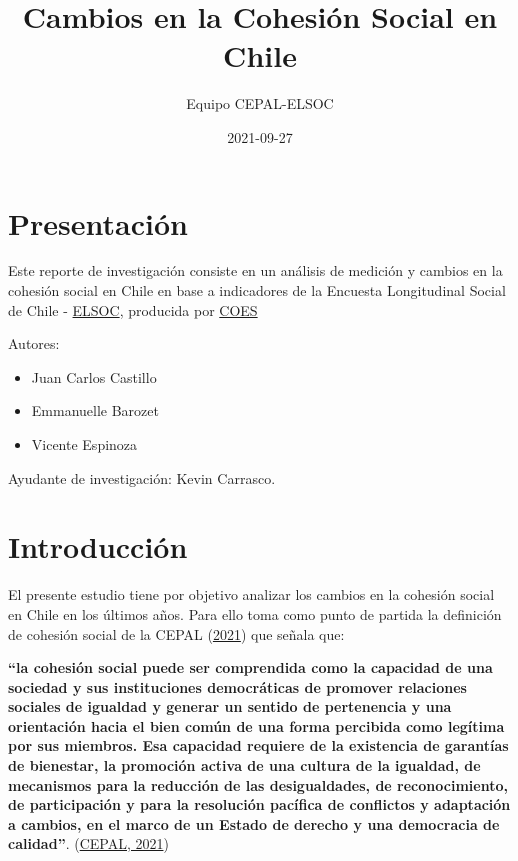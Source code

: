 \documentclass[
  12pt,
]{book}
\title{Cambios en la Cohesión Social en Chile}
\author{Equipo CEPAL-ELSOC}
\date{2021-09-27}
\providecommand{\tightlist}{%
  \setlength{\itemsep}{0pt}\setlength{\parskip}{0pt}}
\begin{document}
\maketitle

{
\hypersetup{linkcolor=}
\setcounter{tocdepth}{1}
\tableofcontents
}
\listoffigures
\listoftables
{}
\hypertarget{presentaciuxf3n}{%
\chapter*{Presentación}\label{presentaciuxf3n}}

Este reporte de investigación consiste en un análisis de medición y cambios en la cohesión social en Chile en base a indicadores de la Encuesta Longitudinal Social de Chile - \href{https://coes.cl/encuesta-panel/}{ELSOC}, producida por \href{https://coes.cl/}{COES}

Autores:

\begin{itemize}
\tightlist
\item
  Juan Carlos Castillo
\item
  Emmanuelle Barozet
\item
  Vicente Espinoza
\end{itemize}

Ayudante de investigación: Kevin Carrasco.

\hypertarget{introducciuxf3n}{%
\chapter*{Introducción}\label{introducciuxf3n}}

El presente estudio tiene por objetivo analizar los cambios en la cohesión social en Chile en los últimos años. Para ello toma como punto de partida la definición de cohesión social de la CEPAL (\protect\hyperlink{ref-cepal_cohesion_2021}{2021}) que señala que:

\textbf{``la cohesión social puede ser comprendida como la capacidad de una sociedad y sus instituciones democráticas de promover relaciones sociales de igualdad y generar un sentido de pertenencia y una orientación hacia el bien común de una forma percibida como legítima por sus miembros. Esa capacidad requiere de la existencia de garantías de bienestar, la promoción activa de una cultura de la igualdad, de mecanismos para la reducción de las desigualdades, de reconocimiento, de participación y para la resolución pacífica de conflictos y adaptación a cambios, en el marco de un Estado de derecho y una democracia de calidad''}. (\protect\hyperlink{ref-cepal_cohesion_2021}{CEPAL, 2021})
\end{document}
